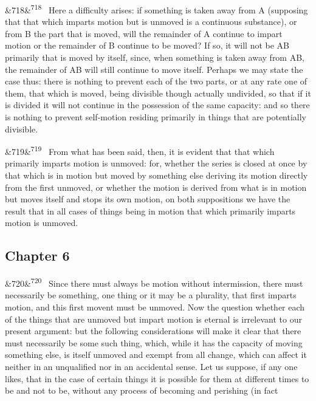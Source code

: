 \documentclass[12pt]{article}
\newcommand{\para}[1][]{\par\noindent\ifx&#1&\else\textsuperscript{\footnotesize #1}~\fi}
\begin{document}
\para[718] Here a difficulty arises: if something is taken away from A (supposing that that which imparts motion but is unmoved is a continuous substance), or from B the part that is moved, will the remainder of A continue to impart motion or the remainder of B continue to be moved? If so, it will not be AB primarily that is moved by itself, since, when something is taken away from AB, the remainder of AB will still continue to move itself. Perhaps we may state the case thus: there is nothing to prevent each of the two parts, or at any rate one of them, that which is moved, being divisible though actually undivided, so that if it is divided it will not continue in the possession of the same capacity: and so there is nothing to prevent self-motion residing primarily in things that are potentially divisible.

\para[719] From what has been said, then, it is evident that that which primarily imparts motion is unmoved: for, whether the series is closed at once by that which is in motion but moved by something else deriving its motion directly from the first unmoved, or whether the motion is derived from what is in motion but moves itself and stops its own motion, on both suppositions we have the result that in all cases of things being in motion that which primarily imparts motion is unmoved.

\subsection*{Chapter 6}

\para[720] Since there must always be motion without intermission, there must necessarily be something, one thing or it may be a plurality, that first imparts motion, and this first movent must be unmoved. Now the question whether each of the things that are unmoved but impart motion is eternal is irrelevant to our present argument: but the following considerations will make it clear that there must necessarily be some such thing, which, while it has the capacity of moving something else, is itself unmoved and exempt from all change, which can affect it neither in an unqualified nor in an accidental sense. Let us suppose, if any one likes, that in the case of certain things it is possible for them at different times to be and not to be, without any process of becoming and perishing (in fact
\end{document}
